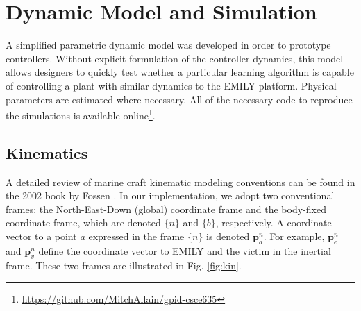 \documentclass[conference]{IEEEtran}
\begin{document}





\begin{framed}\label{nomenclature}
\printnomenclature
\end{framed}


\section{Dynamic Model and Simulation} %
\label{sec:dynamic_model_and_simulation}

A simplified parametric dynamic model was developed in order to prototype controllers. Without explicit formulation of the controller dynamics, this model allows designers to quickly test whether a particular learning algorithm is capable of controlling a plant with similar dynamics to the EMILY platform. Physical parameters are estimated where necessary. All of the necessary code to reproduce the simulations is available online\footnote{\url{https://github.com/MitchAllain/gpid-csce635}}.

\subsection{Kinematics}
A detailed review of marine craft kinematic modeling conventions can be found in the 2002 book by Fossen \cite{fossen2011handbook}. In our implementation, we adopt two conventional frames: the  North-East-Down (global) coordinate frame and the body-fixed coordinate frame, which are denoted  $\{n\}$ and $\{b\}$, respectively. A  coordinate vector to a point  $a$ expressed in the frame $\{n\}$ is denoted $\bm{p}_a^n$. For example, $\bm{p}_e^n$ and $\bm{p}_v^n$ define the coordinate vector to EMILY and the victim in the inertial frame. These two frames are illustrated in Fig. \ref{fig:kin}.
\end{document}
